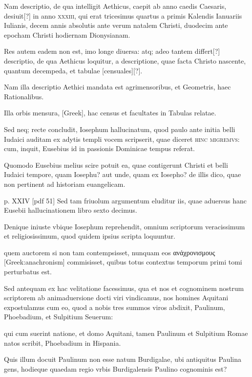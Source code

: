 \begin{parnumbers}
Nam descriptio, de qua intelligit Aethicus, caepit ab anno caedis
Caesaris, desiuit[?] in anno \textsc{xxxiii},
 qui erat tricesimus quartus a primis
Kalendis Ianuariis Iulianis, decem annis absolutis ante verum
natalem Christi, duodecim ante epocham Christi hodiernam Dionysianam.

Res autem eadem non est, imo longe diuersa: atq; adeo
tantem differt[?] descriptio, de qua Aethicus loquitur, a descriptione,
quae facta Christo nascente, quantum decempeda, et tabulae [censuales][?].

Nam illa descriptio Aethici mandata est agrimensoribus, et
Geometris, haec Rationalibus.

Illa orbis mensura, \textgreek{[Greek]},
hac census et facultates in Tabulas relatae.

Sed neq; recte concludit,
Iosephum hallucinatum, quod paulo ante initia belli Iudaici
auditam ex adytis templi vocem scripserit, quae diceret \textsc{hinc
migremvs}: cum, inquit, Eusebius id in passionis Dominicae tempus
referat.

Quomodo Eusebius melius scire potuit ea, quae contigerunt
Christi et belli Iudaici tempore, quam Iosephu? aut unde,
quam ex Iosepho? de illis dico, quae non pertinent ad historiam euangelicam.



\clearpage
p. XXIV [pdf 51]
Sed tam friuolum argumentum eluditur iis, quae aduersus
hanc Eusebii hallucinationem libro sexto decimus.

Denique iniuste
vbique Iosephum reprehendit, omnium scriptorum veracissimum
et religiosissimum, quod quidem ipsius scripta loquuntur.

quem
auctorem si non tam contempsisset, nunquam eos
 \textgreek{ανἀχρονισμους [Greek:anachronism]} commisisset,
quibus totus contextus temporum primi tomi perturbatus
est.

Sed antequam ex hac velitatione facessimus, qua et nos et cognominem
nostrum scriptorem ab animaduersione docti viri vindicamus,
nos homines Aquitani expostulamus cum eo, quod a nobis
tres summos viros abdixit, Paulinum, Phoebadium, et Sulpitium
Seuerum:

qui cum suerint natione, et domo Aquitani, tamen
Paulinum et Sulpitium Romae natos scribit, Phoebadium in Hispania.

Quis illum docuit Paulinum non esse natum Burdigalae, ubi
antiquitus Paulina gens, hodieque quaedam regio vrbis Burdigalensis
Paulino cognominis est?


\end{parnumbers}
